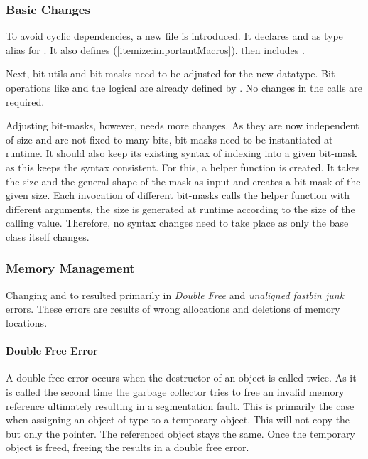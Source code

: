 \subsubsection*{Basic Changes}\label{subsub:gmpBasicChanges}
To avoid cyclic dependencies, a new file  is introduced.
It declares  and  as type alias for .
It also defines  (\ref{itemize:importantMacros}).
 then includes .

Next, bit-utils and bit-masks need to be adjusted for the new datatype.
Bit operations like  and the logical  are already defined by .
No changes in the calls are required.

Adjusting bit-masks, however, needs more changes.
As they are now independent of size and are not fixed to  many bits, bit-masks need to be instantiated at runtime.
It should also keep its existing syntax of indexing into a given bit-mask as this keeps the syntax consistent.
For this, a helper function  is created.
It takes the size and the general shape of the mask as input and creates a bit-mask of the given size.
Each invocation of different bit-masks calls the helper function with different arguments, the size is generated at runtime according to the size of the calling value.
Therefore, no syntax changes need to take place as only the base class itself changes.

\subsubsection*{Memory Management}\label{subsub:gmpMemoryManagement}
Changing  and  to  resulted primarily in \textit{Double Free} and \textit{unaligned fastbin junk} errors.
These errors are results of wrong allocations and deletions of memory locations. 

\paragraph{Double Free Error}\label{par:doubleFree}
A double free error occurs when the destructor of an object is called twice.
As it is called the second time the garbage collector tries to free an invalid memory reference ultimately resulting in a segmentation fault.
This is primarily the case when assigning an object of type  to a temporary object.
This will not copy the  but only the pointer.
The referenced object stays the same.
Once the temporary object is freed, freeing the  results in a double free error.

